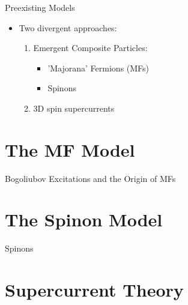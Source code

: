 \documentclass{beamer}
\begin{document}


\begin{frame}{Preexisting Models}


    \begin{itemize}
        \item Two divergent approaches:
            \begin{enumerate}
                \item Emergent Composite Particles:
                    \begin{itemize}
                        \item 'Majorana' Fermions (MFs)
                        \item Spinons
                    \end{itemize}
        
                \item 3D spin supercurrents
        \end{enumerate}
    \end{itemize}
    

\end{frame}



\section{The MF Model}

\begin{frame}{Bogoliubov Excitations and the Origin of MFs}
    
\end{frame}



\section{The Spinon Model}


\begin{frame}{Spinons}
    
\end{frame}



\section{Supercurrent Theory}
\end{document}
